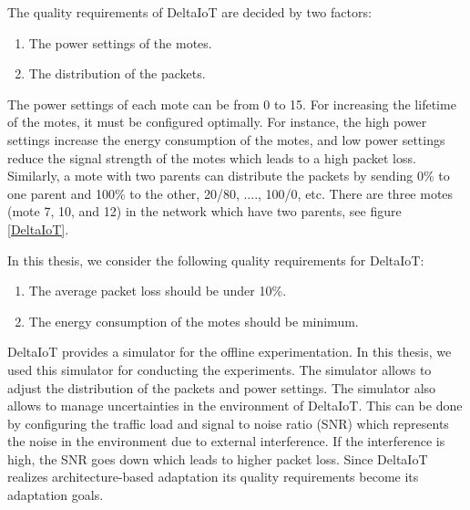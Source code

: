 \documentclass[a4paper,12pt]{article}
\begin{document}
The quality requirements of DeltaIoT are decided by two factors:
\begin{enumerate}
	\item The power settings of the motes.
	\item The distribution of the packets.
\end{enumerate}
The power settings of each mote can be from 0 to 15. For increasing the lifetime of the motes, it must be configured optimally. For instance, the high power settings increase the energy consumption of the motes, and low power settings reduce the signal strength of the motes which leads to a high packet loss. Similarly, a mote with two parents can distribute the packets by sending 0\% to one parent and 100\% to the other, 20/80, ...., 100/0, etc. There are three motes (mote 7, 10, and 12) in the network which have two parents, see figure \ref{DeltaIoT}. 

In this thesis, we consider the following quality requirements for DeltaIoT:
\begin{enumerate}
	\item The average packet loss should be under 10\%.
	\item The energy consumption of the motes should be minimum. 
\end{enumerate}
DeltaIoT provides a simulator for the offline experimentation. In this thesis, we used this simulator for conducting the experiments. The simulator allows to adjust the distribution of the packets and power settings. The simulator also allows to manage uncertainties in the environment of DeltaIoT. This can be done by configuring the traffic load and signal to noise ratio (SNR) which represents the noise in the environment due to external interference. If the interference is high, the SNR goes down which leads to higher packet loss. Since DeltaIoT realizes architecture-based adaptation its quality requirements become its adaptation goals.
\end{document}
